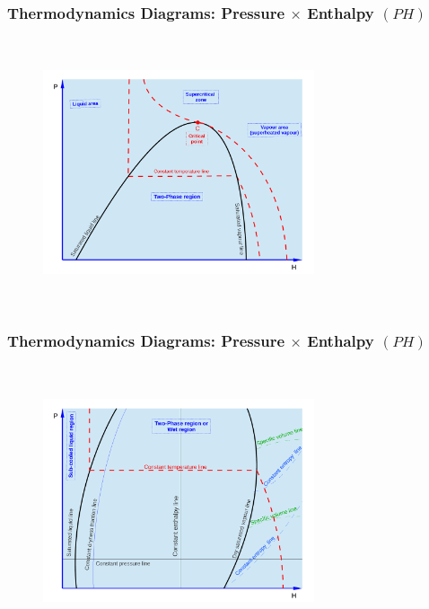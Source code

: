 \documentclass[10pt,compress]{beamer}
\begin{document}
\begin{frame}
 \frametitle{Thermodynamics Diagrams: Pressure $\times$ Enthalpy $(PH)$}
  \begin{center}
   \begin{figure}
      \includegraphics[width=8cm,height=7.9cm,clip]{./Pics/Overview_Refrig18}
   \end{figure}
   \end{center}
\end{frame}

\begin{frame}
 \frametitle{Thermodynamics Diagrams: Pressure $\times$ Enthalpy $(PH)$}
  \begin{center}
   \begin{figure} 
      \includegraphics[width=8cm,height=7.9cm,clip]{./Pics/Overview_Refrig17}
   \end{figure}
   \end{center}
\end{frame}
\end{document}
